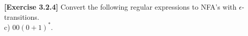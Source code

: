 \textbf{[Exercise 3.2.4]} Convert the following regular expressions to NFA's with 
$\epsilon$-transitions.\\
c) $00(0+1)^*.$
